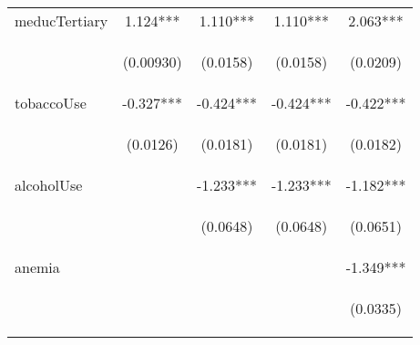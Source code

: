 \begin{table}[htpb!]
\begin{center}
{\begin{tabular}{lcccc}
meducTertiary & 1.124*** & 1.110*** & 1.110*** & 2.063*** \\
\vspace{4pt} & \begin{footnotesize}(0.00930)\end{footnotesize} & \begin{footnotesize}(0.0158)\end{footnotesize} & \begin{footnotesize}(0.0158)\end{footnotesize} & \begin{footnotesize}(0.0209)\end{footnotesize} \\
tobaccoUse & -0.327*** & -0.424*** & -0.424*** & -0.422*** \\
\vspace{4pt} & \begin{footnotesize}(0.0126)\end{footnotesize} & \begin{footnotesize}(0.0181)\end{footnotesize} & \begin{footnotesize}(0.0181)\end{footnotesize} & \begin{footnotesize}(0.0182)\end{footnotesize} \\
alcoholUse &  & -1.233*** & -1.233*** & -1.182*** \\
\vspace{4pt} & \begin{footnotesize}\end{footnotesize} & \begin{footnotesize}(0.0648)\end{footnotesize} & \begin{footnotesize}(0.0648)\end{footnotesize} & \begin{footnotesize}(0.0651)\end{footnotesize} \\
anemia &  &  &  & -1.349*** \\
\vspace{4pt} & \begin{footnotesize}\end{footnotesize} & \begin{footnotesize}\end{footnotesize} & \begin{footnotesize}\end{footnotesize} & \begin{footnotesize}(0.0335)\end{footnotesize} \\

\end{tabular}}
\end{center}
\end{table}
